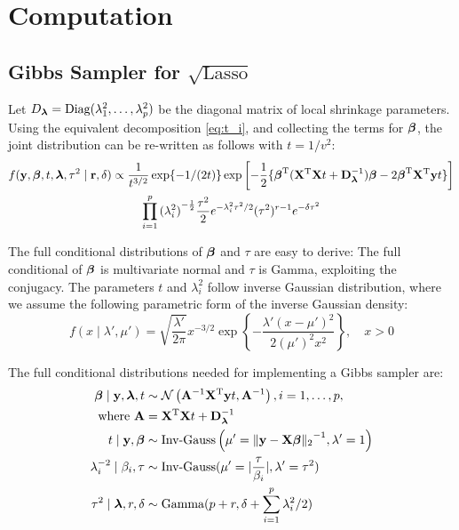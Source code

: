 \documentclass[10pt]{article}
\def\sql{$\sqrt{\text{Lasso}}$}
\begin{document}
\section{Computation}\label{sec:comp}

\subsection{Gibbs Sampler for \sql{}}\label{subsec:comp-sql}

Let $ D_{\boldsymbol{\lambda}} = \text{Diag}(\lambda_1^2, \ldots, \lambda_p^2)$ be the diagonal matrix of local shrinkage parameters. 
Using the equivalent decomposition \eqref{eq:t_i}, and collecting the terms for $\boldsymbol{\beta}$, the joint distribution can be re-written as follows with $t = 1/v^2$: 
\begin{multline}
f({\bf y}, \boldsymbol{\beta}, t, \boldsymbol{\lambda}, \tau^2 \mid {\bf r}, \delta) \propto 
\frac{1}{t^{3/2}} \exp\{-{1}/({2 t}) \} \exp \left[- \frac{1}{2} \{ \boldsymbol{\beta}^{\rm T}({\bf X}^{\rm T} {\bf X} t + {\bf D}_{\boldsymbol{\lambda}}^{-1})\boldsymbol{\beta} - 2 \boldsymbol{\beta}^{\rm T} {\bf X}^{\rm T} {\bf y} t \}\right] \\
\prod_{i=1}^{p} {(\lambda_i^2)}^{-\frac{1}{2}} \frac{\tau^2}{2} e^{-\lambda_i^2\tau^2/2} (\tau^2)^{r-1} e^{-\delta \tau^2} \label{eq:joint-beta}
\end{multline}

The full conditional distributions of $\boldsymbol{\beta}$ and $\tau$ are easy to derive: The full conditional of $\boldsymbol{\beta}$ is multivariate normal and $\tau$ is Gamma, exploiting the conjugacy. The parameters $t$ and $\lambda_i^2$ follow inverse Gaussian distribution, where we assume the following parametric form of the inverse Gaussian density:
\[
f(x \mid \lambda', \mu') = \sqrt{\frac{\lambda'}{2\pi}} x^{-3/2} \exp\left\{ - \frac{\lambda'(x-\mu')^2}{2(\mu')^2 x^2} \right \}, \quad x > 0 
\]

The full conditional distributions needed for implementing a Gibbs sampler are:	
\begin{align*}
\boldsymbol{\beta} \mid {\bf y}, \boldsymbol{\lambda}, t & \sim \mathcal{N} \left( {\bf A}^{-1}{\bf X}^{\rm T} {\bf y} t , {\bf A}^{-1} \right), i = 1, \ldots, p, \\
\text{ where } {\bf A} & = {\bf X}^{\rm T} {\bf X} t + {\bf D}_{\boldsymbol{\lambda}}^{-1} \\
t \mid {\bf y}, \boldsymbol{\beta} & \sim \text{Inv-Gauss} \left(\mu' = {\lVert{\bf y}-{\bf X}\boldsymbol{\beta}\rVert_2}^{-1}, \lambda' = 1 \right) \\
\lambda_i^{-2} \mid \beta_i, \tau & \sim \text{Inv-Gauss}(\mu' = \lvert\frac{\tau}{\beta_i}\rvert, \lambda' = \tau^2)\\
\tau^2 \mid \boldsymbol{\lambda}, r, \delta & \sim \text{Gamma}(p + r, \delta + \sum_{i=1}^{p} \lambda_i^2/2)
\end{align*}
\end{document}
